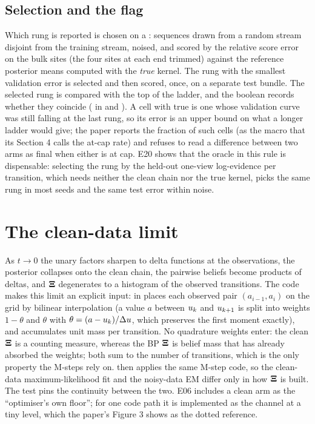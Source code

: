 \subsection{Selection and the  flag}

Which rung is reported is chosen on a : sequences drawn from a
random stream disjoint from the training stream, noised, and scored by the relative
score error on the bulk sites (the four sites at each end trimmed) against the
reference posterior means computed with the \emph{true} kernel. The rung with the
smallest validation error is selected and then scored, once, on a separate test
bundle. The selected rung is compared with the top of the ladder, and the boolean
 records whether they coincide ( in
 and ).
A cell with  true is one whose validation curve was still falling at the
last rung, so its error is an upper bound on what a longer ladder would give; the
paper reports the fraction of such cells (as the macro that its Section 4 calls the
at-cap rate) and refuses to read a difference between two arms as final when either
is at cap. E20 shows that the oracle in this rule is dispensable: selecting the rung
by the held-out one-view log-evidence per transition, which needs neither the clean
chain nor the true kernel, picks the same rung in most seeds and the same test error
within noise.

\section{The clean-data limit}
\label{sec:en-clean}

As $t\to0$ the unary factors sharpen to delta functions at the observations, the
posterior collapses onto the clean chain, the pairwise beliefs become products of
deltas, and $\mathbf{\Xi}$ degenerates to a histogram of the observed transitions. The code
makes this limit an explicit input:  in
 places each observed pair $(a_{i-1},a_i)$ on the grid by
bilinear interpolation (a value $a$ between $u_{k}$ and $u_{k+1}$ is split into
weights $1-\theta$ and $\theta$ with $\theta=(a-u_{k})/\Delta u$, which preserves the
first moment exactly), and accumulates unit mass per transition. No quadrature weights
enter: the clean $\mathbf{\Xi}$ is a counting measure, whereas the BP $\mathbf{\Xi}$ is belief mass that
has already absorbed the weights; both sum to the number of transitions, which is the
only property the M-steps rely on.  then applies the same M-step
code, so the clean-data maximum-likelihood fit and the noisy-data EM differ only in
how $\mathbf{\Xi}$ is built. The test  pins
the continuity between the two. E06 includes a clean arm as the ``optimiser's own
floor''; for one code path it is implemented as the channel at a tiny level, which
the paper's Figure 3 shows as the dotted reference.

